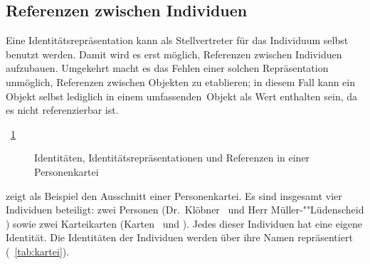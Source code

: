 \subsection{Referenzen zwischen Individuen}
%
Eine Identit\"{a}tsrepr\"{a}sentation kann als Stellvertreter f\"{u}r das
Individuum selbst benutzt werden. Damit wird es erst m\"{o}glich,
Referenzen zwischen Individuen aufzubauen. Umgekehrt macht es das
Fehlen einer solchen Repr\"{a}sentation unm\"{o}glich, Referenzen zwischen
Objekten zu etablieren; in diesem Fall kann ein Objekt selbst
lediglich in einem \rglq{}umfassenden\rgrq\ Objekt als Wert enthalten
sein, da es nicht referenzierbar ist.
%
\par{}\figurename~\ref{fig:kartei} %
%
\begin{figure}[htbp]%
\ifloriot%
\ifbuch%
\centerline{}%
\else%
\centerline{}%
\fi%
\else%
\ifbuch%
\centerline{}%
\else%
\centerline{}%
\fi%
\fi%
\caption{Identit\"{a}ten, Identit\"{a}tsrepr\"{a}sentationen
und Referenzen in einer Personenkartei}%
\label{fig:kartei}%
\end{figure}%
%
zeigt als Beispiel den Ausschnitt einer Personenkartei. Es sind
insgesamt vier Individuen beteiligt: zwei Personen (Dr.\ Kl\"{o}b\-ner
\oiv\ und Herr M\"{u}l\-ler-""L\"{u}\-den\-scheid \ovii) sowie zwei
Karteikarten (Karten \oi\ und \ov). Jedes dieser Individuen hat eine
eigene Identit\"{a}t. Die Identit\"{a}ten der Individuen werden \"{u}ber ihre Namen
repr\"{a}sentiert (\tablename~\ref{tab:kartei}).
%
